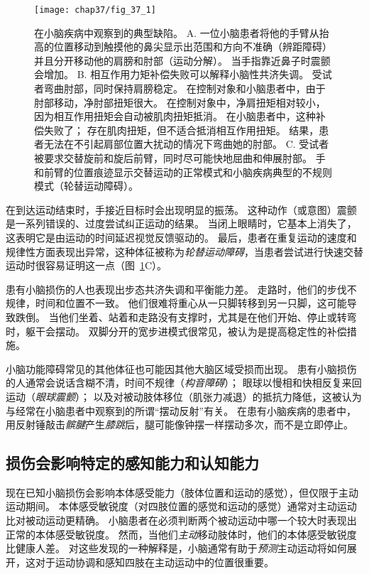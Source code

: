 \begin{figure}[htbp]
	\centering
	\texttt{[image: chap37/fig\_37\_1]}
	\caption{在小脑疾病中观察到的典型缺陷。
		A. 一位小脑患者将他的手臂从抬高的位置移动到触摸他的鼻尖显示出范围和方向不准确（辨距障碍）并且分开移动他的肩膀和肘部（运动分解）。 
		当手指靠近鼻子时震颤会增加。
		B. 相互作用力矩补偿失败可以解释小脑性共济失调。
		受试者弯曲肘部，同时保持肩膀稳定。
		在控制对象和小脑患者中，由于肘部移动，净肘部扭矩很大。
		在控制对象中，净肩扭矩相对较小，因为相互作用扭矩会自动被肌肉扭矩抵消。
		在小脑患者中，这种补偿失败了；
		存在肌肉扭矩，但不适合抵消相互作用扭矩。
		结果，患者无法在不引起肩部位置大扰动的情况下弯曲她的肘部\cite{bastian2000cerebellar}。
		C. 受试者被要求交替旋前和旋后前臂，同时尽可能快地屈曲和伸展肘部。
		手和前臂的位置痕迹显示交替运动的正常模式和小脑疾病典型的不规则模式（轮替运动障碍）。}
	\label{fig:37_1}
\end{figure}


在到达运动结束时，手接近目标时会出现明显的振荡。
这种动作（或意图）震颤是一系列错误的、过度尝试纠正运动的结果。
当闭上眼睛时，它基本上消失了，这表明它是由运动的时间延迟视觉反馈驱动的。
最后，患者在重复运动的速度和规律性方面表现出异常，这种体征被称为\textit{轮替运动障碍}，当患者尝试进行快速交替运动时很容易证明这一点（图~\ref{fig:37_1}C）。


患有小脑损伤的人也表现出步态共济失调和平衡能力差。
走路时，他们的步伐不规律，时间和位置不一致。
他们很难将重心从一只脚转移到另一只脚，这可能导致跌倒。
当他们坐着、站着和走路没有支撑时，尤其是在他们开始、停止或转弯时，躯干会摆动。
双脚分开的宽步进模式很常见，被认为是提高稳定性的补偿措施。


小脑功能障碍常见的其他体征也可能因其他大脑区域受损而出现。
患有小脑损伤的人通常会说话含糊不清，时间不规律（\textit{构音障碍}）；
眼球以慢相和快相反复来回运动（\textit{眼球震颤}）；
以及对被动肢体移位（肌张力减退）的抵抗力降低，这被认为与经常在小脑患者中观察到的所谓“摆动反射”有关。
在患有小脑疾病的患者中，用反射锤敲击\textit{髌腱}产生\textit{膝跳}后，腿可能像钟摆一样摆动多次，而不是立即停止。



\subsection{损伤会影响特定的感知能力和认知能力}

现在已知小脑损伤会影响本体感受能力（肢体位置和运动的感觉），但仅限于主动运动期间。
本体感受敏锐度（对四肢位置的感觉和运动的感觉）通常对主动运动比对被动运动更精确。
小脑患者在必须判断两个被动运动中哪一个较大时表现出正常的本体感受敏锐度。
然而，当他们\textit{主动}移动肢体时，他们的本体感受敏锐度比健康人差。
对这些发现的一种解释是，小脑通常有助于\textit{预测}主动运动将如何展开，这对于运动协调和感知四肢在主动运动中的位置很重要。


